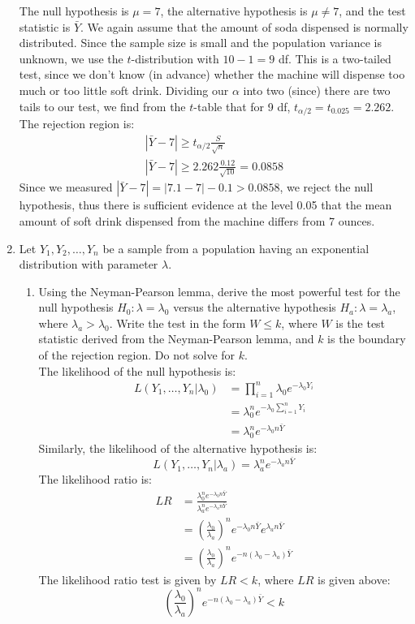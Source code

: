 \documentclass[12pt]{article}
\begin{document}
\begin{enumerate}
The null hypothesis is $\mu = 7$, the alternative hypothesis is $\mu \neq 7$, and the test statistic is $\bar{Y}$. We again assume that the amount of soda dispensed is normally distributed. Since the sample size is small and the population variance is unknown, we use the $t$-distribution with $10 - 1 = 9$ df. This is a two-tailed test, since we don't know (in advance) whether the machine will dispense too much or too little soft drink. Dividing our $\alpha$ into two (since) there are two tails to our test, we find from the $t$-table that for 9 df, $t_{\alpha/2} = t_{0.025} = 2.262$. The rejection region is:
\begin{align*}
|\bar{Y} - 7| \geq t_{\alpha/2} \frac{S}{\sqrt{n}} \\
|\bar{Y} - 7| \geq 2.262 \frac{0.12}{\sqrt{10}} = 0.0858
\end{align*}
Since we measured $|\bar{Y} - 7| = |7.1 - 7| - 0.1 > 0.0858$, we reject the null hypothesis, thus there is sufficient evidence at the level 0.05 that the mean amount of soft drink dispensed from the machine differs from 7 ounces.

\item Let $Y_1, Y_2, \dots, Y_n$ be a sample from a population having an exponential distribution with parameter $\lambda$.
\begin{enumerate}
\item Using the Neyman-Pearson lemma, derive the most powerful test for the null hypothesis $H_0: \lambda = \lambda_0$ versus the alternative hypothesis $H_a: \lambda = \lambda_a$, where $\lambda_a > \lambda_0$. Write the test in the form $W \leq k$, where $W$ is the test statistic derived from the Neyman-Pearson lemma, and $k$ is the boundary of the rejection region. Do not solve for $k$.\\

The likelihood of the null hypothesis is:
\begin{align*}
L(Y_1, \dots, Y_n | \lambda_0) &= \prod_{i=1}^n \lambda_0 e^{-\lambda_0 Y_i} \\
&= \lambda_0^n e^{-\lambda_0 \sum_{i=1}^n Y_i}\\
&= \lambda_0^n e^{-\lambda_0 n \bar{Y}}
\end{align*}
Similarly, the likelihood of the alternative hypothesis is:
\[
L(Y_1, \dots, Y_n | \lambda_a) = \lambda_a^n e^{-\lambda_a n \bar{Y}}
\]
The likelihood ratio is:
\begin{align*}
LR &= \frac{ \lambda_0^n e^{-\lambda_0 n \bar{Y}} }{ \lambda_a^n e^{-\lambda_a n \bar{Y}} } \\
&= \left( \frac{ \lambda_0 }{\lambda_a }\right)^n e^{-\lambda_0 n \bar{Y}} e^{\lambda_a n \bar{Y}} \\
&= \left( \frac{ \lambda_0 }{\lambda_a }\right)^n e^{-n (\lambda_0 - \lambda_a) \bar{Y}}
\end{align*}
The likelihood ratio test is given by $LR < k$, where $LR$ is given above:
\[
\left( \frac{ \lambda_0 }{\lambda_a }\right)^n e^{-n (\lambda_0 - \lambda_a) \bar{Y}} < k
\]


\end{enumerate}
\end{enumerate}
\end{document}
